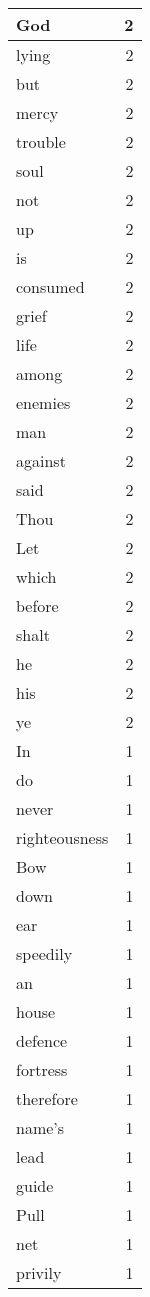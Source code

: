 \begin{center}
\begin{longtable}{l|r}
God & 2 \\ \hline
lying & 2 \\ \hline
but & 2 \\ \hline
mercy & 2 \\ \hline
trouble & 2 \\ \hline
soul & 2 \\ \hline
not & 2 \\ \hline
up & 2 \\ \hline
is & 2 \\ \hline
consumed & 2 \\ \hline
grief & 2 \\ \hline
life & 2 \\ \hline
among & 2 \\ \hline
enemies & 2 \\ \hline
man & 2 \\ \hline
against & 2 \\ \hline
said & 2 \\ \hline
Thou & 2 \\ \hline
Let & 2 \\ \hline
which & 2 \\ \hline
before & 2 \\ \hline
shalt & 2 \\ \hline
he & 2 \\ \hline
his & 2 \\ \hline
ye & 2 \\ \hline
In & 1 \\ \hline
do & 1 \\ \hline
never & 1 \\ \hline
righteousness & 1 \\ \hline
Bow & 1 \\ \hline
down & 1 \\ \hline
ear & 1 \\ \hline
speedily & 1 \\ \hline
an & 1 \\ \hline
house & 1 \\ \hline
defence & 1 \\ \hline
fortress & 1 \\ \hline
therefore & 1 \\ \hline
name's & 1 \\ \hline
lead & 1 \\ \hline
guide & 1 \\ \hline
Pull & 1 \\ \hline
net & 1 \\ \hline
privily & 1 \\ \hline

\end{longtable}
\end{center}
